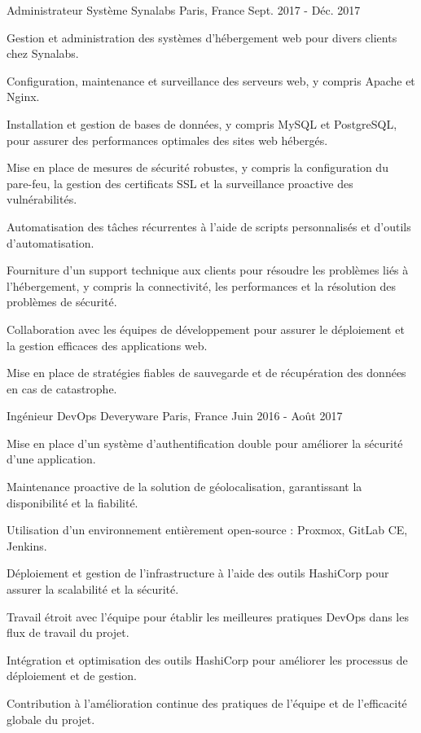 \begin{cventries}
\cventry
{Administrateur Système} %
{Synalabs} %
{Paris, France} %
{Sept. 2017 - Déc. 2017} %
{
  \begin{cvitems} %
    \item {Gestion et administration des systèmes d'hébergement web pour divers clients chez Synalabs.}
    \item {Configuration, maintenance et surveillance des serveurs web, y compris Apache et Nginx.}
    \item {Installation et gestion de bases de données, y compris MySQL et PostgreSQL, pour assurer des performances optimales des sites web hébergés.}
    \item {Mise en place de mesures de sécurité robustes, y compris la configuration du pare-feu, la gestion des certificats SSL et la surveillance proactive des vulnérabilités.}
    \item {Automatisation des tâches récurrentes à l'aide de scripts personnalisés et d'outils d'automatisation.}
    \item {Fourniture d'un support technique aux clients pour résoudre les problèmes liés à l'hébergement, y compris la connectivité, les performances et la résolution des problèmes de sécurité.}
    \item {Collaboration avec les équipes de développement pour assurer le déploiement et la gestion efficaces des applications web.}
    \item {Mise en place de stratégies fiables de sauvegarde et de récupération des données en cas de catastrophe.}
  \end{cvitems}
}

\cventry
{Ingénieur DevOps} %
{Deveryware} %
{Paris, France} %
{Juin 2016 - Août 2017} %
{
  \begin{cvitems} %
    \item {Mise en place d'un système d'authentification double pour améliorer la sécurité d'une application.}
    \item {Maintenance proactive de la solution de géolocalisation, garantissant la disponibilité et la fiabilité.}
    \item {Utilisation d'un environnement entièrement open-source : Proxmox, GitLab CE, Jenkins.}
    \item {Déploiement et gestion de l'infrastructure à l'aide des outils HashiCorp pour assurer la scalabilité et la sécurité.}
    \item {Travail étroit avec l'équipe pour établir les meilleures pratiques DevOps dans les flux de travail du projet.}
    \item {Intégration et optimisation des outils HashiCorp pour améliorer les processus de déploiement et de gestion.}
    \item {Contribution à l'amélioration continue des pratiques de l'équipe et de l'efficacité globale du projet.}
  \end{cvitems}
}


\end{cventries}
